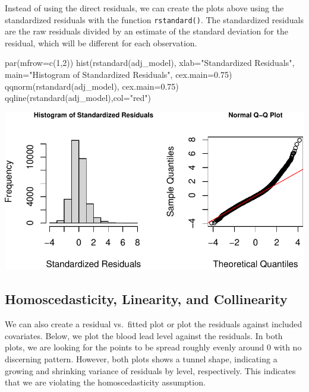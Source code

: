 \documentclass[
  letterpaper,
]{krantz}
\makeatletter
\newenvironment{Shaded}{\begin{snugshade}}{\end{snugshade}}
\newcommand{\AttributeTok}[1]{\textcolor[rgb]{0.40,0.45,0.13}{#1}}
\newcommand{\DecValTok}[1]{\textcolor[rgb]{0.68,0.00,0.00}{#1}}
\newcommand{\FloatTok}[1]{\textcolor[rgb]{0.68,0.00,0.00}{#1}}
\newcommand{\FunctionTok}[1]{\textcolor[rgb]{0.28,0.35,0.67}{#1}}
\newcommand{\NormalTok}[1]{\textcolor[rgb]{0.00,0.23,0.31}{#1}}
\newcommand{\StringTok}[1]{\textcolor[rgb]{0.13,0.47,0.30}{#1}}
\newenvironment{kframe}{%
\medskip{}
\setlength{\fboxsep}{.8em}
 \def\at@end@of@kframe{}%
 \ifinner\ifhmode%
  \def\at@end@of@kframe{\end{minipage}}%
  \begin{minipage}{\columnwidth}%
 \fi\fi%
 \def\FrameCommand##1{\hskip\@totalleftmargin \hskip-\fboxsep
 \colorbox{shadecolor}{##1}\hskip-\fboxsep
     \hskip-\linewidth \hskip-\@totalleftmargin \hskip\columnwidth}%
 \MakeFramed {\advance\hsize-\width
   \@totalleftmargin\z@ \linewidth\hsize
   \@setminipage}}%
 {\par\unskip\endMakeFramed%
 \at@end@of@kframe}
\renewenvironment{Shaded}{\begin{kframe}}{\end{kframe}}
\makeatother
\begin{document}
Instead of using the direct residuals, we can create the plots above
using the standardized residuals with the function \texttt{rstandard()}.
The standardized residuals are the raw residuals divided by an estimate
of the standard deviation for the residual, which will be different for
each observation.

\begin{Shaded}
\begin{Highlighting}[]
\FunctionTok{par}\NormalTok{(}\AttributeTok{mfrow=}\FunctionTok{c}\NormalTok{(}\DecValTok{1}\NormalTok{,}\DecValTok{2}\NormalTok{)) }
\FunctionTok{hist}\NormalTok{(}\FunctionTok{rstandard}\NormalTok{(adj\_model), }\AttributeTok{xlab=}\StringTok{"Standardized Residuals"}\NormalTok{, }
     \AttributeTok{main=}\StringTok{"Histogram of Standardized Residuals"}\NormalTok{, }\AttributeTok{cex.main=}\FloatTok{0.75}\NormalTok{) }
\FunctionTok{qqnorm}\NormalTok{(}\FunctionTok{rstandard}\NormalTok{(adj\_model), }\AttributeTok{cex.main=}\FloatTok{0.75}\NormalTok{) }
\FunctionTok{qqline}\NormalTok{(}\FunctionTok{rstandard}\NormalTok{(adj\_model),}\AttributeTok{col=}\StringTok{"red"}\NormalTok{)}
\end{Highlighting}
\end{Shaded}

\begin{center}
\includegraphics[width=1\textwidth,height=\textheight]{book/linear_regression_files/figure-pdf/unnamed-chunk-18-1.pdf}
\end{center}

\subsection{Homoscedasticity, Linearity, and
Collinearity}\label{homoscedasticity-linearity-and-collinearity}

We can also create a residual vs.~fitted plot or plot the residuals
against included covariates. Below, we plot the blood lead level against
the residuals. In both plots, we are looking for the points to be spread
roughly evenly around 0 with no discerning pattern. However, both plots
shows a tunnel shape, indicating a growing and shrinking variance of
residuals by level, respectively. This indicates that we are violating
the homoscedasticity assumption.
\end{document}
